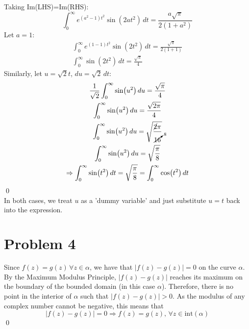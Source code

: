 \documentclass[a4paper, titlepage, DIV=14]{scrartcl}
\begin{document}
    Taking Im(LHS)=Im(RHS):
    \begin{equation*}
        \int_{0}^{\infty} e^{(a^{2}-1)t^{2}}\sin(2at^{2}) \, dt = \frac{a\sqrt{\pi}}{2(1+a^{2})}
    \end{equation*}
    Let $a=1$:
    \begin{gather*}
        \int_{0}^{\infty} e^{(1-1)t^{2}}\sin(2t^{2}) \, dt = \frac{\sqrt{\pi}}{2(1+1)} \\
        \int_{0}^{\infty} \sin(2t^{2}) \, dt = \frac{\sqrt{\pi}}{4} 
    \end{gather*}    
    Similarly, let $u=\sqrt{2}t$, $du = \sqrt{2}\, dt$:
    \begin{gather*}
        \frac{1}{\sqrt{2}}\int_{0}^{\infty} \sin(u^{2}) \, du = \frac{\sqrt{\pi}}{4} \\
        \int_{0}^{\infty} \sin(u^{2}) \, du = \frac{\sqrt{2\pi}}{4} \\
        \int_{0}^{\infty} \sin(u^{2}) \, du = \sqrt{\frac{\cancel{2}\pi}{\cancelto{8}{16}}} \\
        \int_{0}^{\infty} \sin(u^{2}) \, du = \sqrt{\frac{\pi}{8}} \\
        \Rightarrow \int_{0}^{\infty} \sin(t^{2}) \, dt = \sqrt{\frac{\pi}{8}} = \int_{0}^{\infty} \cos(t^{2}) \, dt 
    \end{gather*} \qed \\
    In both cases, we treat $u$ as a 'dummy variable' and just substitute $u=t$ back into the expression.

    \section*{Problem 4}
    Since $f(z)=g(z)\, \forall z \in\alpha$, we have that $|f(z)-g(z)|=0$ on the curve $\alpha$. By the Maximum Modulus Principle, 
    $|f(z)-g(z)|$ reaches its maximum on the boundary of the bounded domain (in this case $\alpha$). Therefore, there is no point in the
    interior of $\alpha$ such that $|f(z)-g(z)|>0$. As the modulus of any complex number cannot be negative, this means that 
    \begin{equation*}
        |f(z)-g(z)|=0 \Rightarrow f(z)=g(z), \, \forall z\in \text{int}(\alpha)
    \end{equation*}\qed
    
\end{document}
